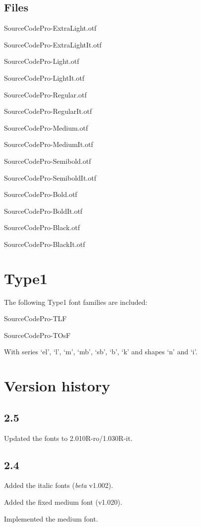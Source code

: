 \documentclass[10pt,a4paper,english]{article}
\begin{document}
\begin{multicols}{2}
\subsection{Files}
\begin{itemize*}
	\item SourceCodePro-ExtraLight.otf
	\item SourceCodePro-ExtraLightIt.otf
	\item SourceCodePro-Light.otf
	\item SourceCodePro-LightIt.otf
	\item SourceCodePro-Regular.otf
	\item SourceCodePro-RegularIt.otf
	\item SourceCodePro-Medium.otf
	\item SourceCodePro-MediumIt.otf	
	\item SourceCodePro-Semibold.otf
	\item SourceCodePro-SemiboldIt.otf
	\item SourceCodePro-Bold.otf
	\item SourceCodePro-BoldIt.otf
	\item SourceCodePro-Black.otf
	\item SourceCodePro-BlackIt.otf
\end{itemize*}

\section{Type1}
The following Type1 font families are included:
\begin{itemize*}
	\item SourceCodePro-TLF
	\item SourceCodePro-TOsF
\end{itemize*}
With series ‘el’, ‘l’, ‘m’, ‘mb’, ‘sb’, ‘b’, ‘k’ and shapes ‘n’ and ‘i’.

\section{Version history}
\subsection*{2.5}
\begin{itemize*}
	\item Updated the fonts to 2.010R-ro/1.030R-it.
\end{itemize*}

\subsection*{2.4}
\begin{itemize*}
	\item Added the italic fonts (\emph{beta} v1.002).
	\item Added the fixed medium font (v1.020).
	\item Implemented the medium font.
\end{itemize*}


\end{multicols}
\end{document}
